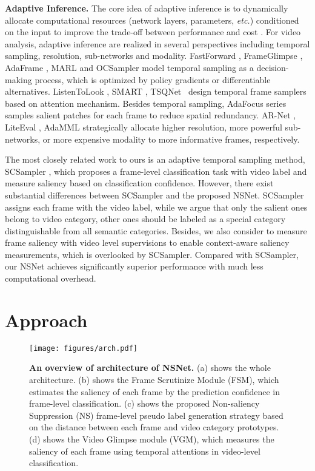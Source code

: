 \documentclass[runningheads]{llncs}
\begin{document}
\noindent\textbf{Adaptive Inference.} The core idea of adaptive inference is to dynamically allocate computational resources (network layers, parameters, \emph{etc.}) conditioned on the input to improve the trade-off between performance and cost \cite{dynamic_survey,wu2020dynamic}.
For video analysis, adaptive inference are realized in several perspectives including temporal sampling, resolution, sub-networks and modality. FastForward \cite{fastforward}, FrameGlimpse \cite{frameglimpse}, AdaFrame \cite{adaframe}, MARL \cite{marl} and OCSampler \cite{ocsampler} model temporal sampling as a decision-making process, which is optimized by policy gradients or differentiable alternatives.  ListenToLook \cite{listentolook}, SMART \cite{smart2020}, TSQNet~\cite{tsqnet} design temporal frame samplers based on attention mechanism. Besides temporal sampling, AdaFocus series \cite{adafocus,adafocusv2} samples salient patches for each frame to reduce spatial redundancy. AR-Net \cite{arnet}, LiteEval \cite{liteeval}, AdaMML \cite{adamml} strategically allocate higher resolution, more powerful sub-networks, or more expensive modality to more informative frames, respectively. 

The most closely related work to ours is an adaptive temporal sampling method, SCSampler \cite{scsampler19}, which proposes a frame-level classification task with video label and measure saliency based on classification confidence. However, there exist substantial differences between SCSampler and the proposed NSNet. SCSampler assigns each frame with the video label, while we argue that only the salient ones belong to video category, other ones should be labeled as a special category distinguishable from all semantic categories. Besides, we also consider to measure frame saliency with video level supervisions to enable context-aware saliency measurements, which is overlooked by SCSampler.
Compared with SCSampler, our NSNet achieves significantly superior performance with much less computational overhead.
\section{Approach}
\label{sec:approach}
\begin{figure*}[t]
      \centering
      \texttt{[image: figures/arch.pdf]}
      \caption{\textbf{An overview of architecture of NSNet.} 
(a) shows the whole architecture. (b) shows the Frame Scrutinize Module (FSM), which estimates the saliency of each frame by the prediction confidence in frame-level classification. (c) shows the proposed Non-saliency Suppression (NS) frame-level pseudo label generation strategy based on the distance between each frame and video category prototypes. (d) shows the Video Glimpse module (VGM), which measures the saliency of each frame using temporal attentions in video-level classification.
      }
      \label{fig:arch}
      
\end{figure*} 
\end{document}
